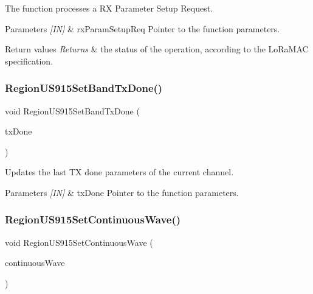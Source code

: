 The function processes a RX Parameter Setup Request. 


\begin{DoxyParams}{Parameters}
{\em \mbox{[}\+I\+N\mbox{]}} & rx\+Param\+Setup\+Req Pointer to the function parameters.\\
\hline
\end{DoxyParams}

\begin{DoxyRetVals}{Return values}
{\em Returns} & the status of the operation, according to the Lo\+Ra\+M\+AC specification. \\
\hline
\end{DoxyRetVals}
\mbox{\label{group__REGIONUS915_ga821c323447c6cadc64cd2d25725782c0}} 
\subsubsection{\texorpdfstring{Region\+U\+S915\+Set\+Band\+Tx\+Done()}{RegionUS915SetBandTxDone()}}
{\footnotesize\ttfamily void Region\+U\+S915\+Set\+Band\+Tx\+Done (\begin{DoxyParamCaption}\item[{\hyperlink{group__REGION_gad0524aa0673c0814a71e7a4f9cade3fc}{Set\+Band\+Tx\+Done\+Params\+\_\+t} $\ast$}]{tx\+Done }\end{DoxyParamCaption})}



Updates the last TX done parameters of the current channel. 


\begin{DoxyParams}{Parameters}
{\em \mbox{[}\+I\+N\mbox{]}} & tx\+Done Pointer to the function parameters. \\
\hline
\end{DoxyParams}
\mbox{\label{group__REGIONUS915_gaa87cec170f4c2f1a257f8228b7dd321f}} 
\subsubsection{\texorpdfstring{Region\+U\+S915\+Set\+Continuous\+Wave()}{RegionUS915SetContinuousWave()}}
{\footnotesize\ttfamily void Region\+U\+S915\+Set\+Continuous\+Wave (\begin{DoxyParamCaption}\item[{\hyperlink{group__REGION_gaf39bb5ba06921139c6d17f88a8d518cd}{Continuous\+Wave\+Params\+\_\+t} $\ast$}]{continuous\+Wave }\end{DoxyParamCaption})}



